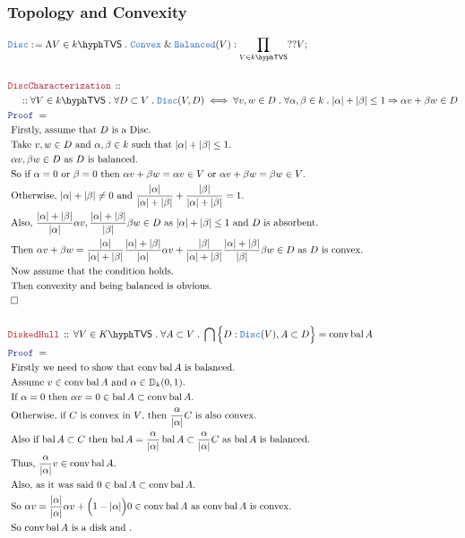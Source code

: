 \documentclass[12pt]{scrartcl}
\newcommand{\TYPE}[1]{\textcolor{NavyBlue}{\mathtt{#1}}}
\newcommand{\LOGIC}[1]{\textcolor{Blue}{\mathtt{#1}}}
\newcommand{\THM}[1]{\textcolor{Maroon}{\mathtt{#1}}}
\renewcommand{\.}{\; . \;}
\newcommand{\de}{: \kern 0.1pc =}
\newcommand{\Theorem}[2]{& \THM{#1} \, :: \, #2 \\ & \Proof = \\ }
\newcommand{\NewLine}{\\ & \kern 1pc}
\newcommand{\Page}[1]{ \begin{align*} #1 \end{align*}   }
\newcommand{\Explain}[1]{& \text{#1.} \\}
\renewcommand{\And}{\; \& \;}
\newcommand{\Imply}{\Rightarrow}
\newcommand{\Conclude}[3]{& #1 \de #2 : #3; \\}
\newcommand{\QED}{\; \square}
\newcommand{\EndProof}{& \QED \\}
\newcommand{\Proof}{\LOGIC{Proof} \; }
\newcommand{\Disc}{\mathbb{D}}
\newcommand{\Convex}{\TYPE{Convex}}
\DeclareMathOperator{\conv}{conv}
\newcommand{\TVS}[1]{{#1}\hyph\mathsf{TVS}}
\DeclareMathOperator{\bal}{\mathrm{bal}}
\begin{document}
\subsubsection{Topology and Convexity}
\Page{
	\Conclude{\TYPE{Disc}}{ \Lambda V \in \TVS{k} \. \Convex \And \TYPE{Balanced}(V) }
	{
		\prod_{V \in \TVS{k}} ??V
	}
	\\
	\Theorem{DiscCharacterization}
	{
		\NewLine ::		
		\forall V \in \TVS{k} \.
		\forall D \subset V \.
		\TYPE{Disc}(V,D)
		\iff
		\forall v,w \in D \.
		\forall \alpha, \beta \in k \.
		|\alpha| + |\beta| \le 1
		\Imply
		\alpha v + \beta w \in D 
	}
	\Explain{ Firstly, assume that $D$ is a Disc}
	\Explain{ 
		Take $v,w \in D$ and $\alpha, \beta \in k$ such that $|\alpha| + |\beta| \le 1$}
	\Explain{
		$\alpha v, \beta w \in D$ as $D$ is balanced}
	\Explain{
		So if $\alpha = 0$ or $\beta = 0$ then $\alpha v + \beta w = \alpha v \in V$ or
		$\alpha v + \beta w  = \beta w \in V$}
	\Explain{
		Otherwise, $|\alpha| + |\beta| \neq 0$ and  $ \frac{|\alpha|}{|\alpha| + |\beta|} +  
			\frac{|\beta|}{|\alpha| + |\beta|} = 1$}
	\Explain{
		Also, $\frac{|\alpha| + |\beta|}{|\alpha|} \alpha v, 
		\frac{|\alpha| + |\beta|}{|\beta|} \beta w \in D$
		as $|\alpha| + |\beta| \le 1$ and $D$ is absorbent}
	\Explain{
		Then 
		$\alpha v + \beta w = 
		\frac{|\alpha|}{|\alpha| + |\beta|} \frac{|\alpha| + |\beta|}{|\alpha|} \alpha v +  
		\frac{|\beta|}{|\alpha| + |\beta|}	\frac{|\alpha| + |\beta|}{|\beta|} \beta w \in D
		$ as $D$ is convex}
	\Explain{
		Now assume that the condition holds}
	\Explain{
		Then convexity and being balanced is obvious}
	\EndProof
	\\
	\Theorem{DiskedHull}
	{
		\forall V \in \TVS{K} \.
		\forall A \subset V \.
		\bigcap \Big\{ D : \TYPE{Disc}(V), A \subset D  \Big\} = 
		\conv \bal A
	}
	\Explain{
		Firstly we need to show that $\conv \bal A$ is balanced}
	\Explain{
		Assume $v \in \conv \bal A$ and $\alpha \in \Disc_k(0,1)$}
	\Explain{
		If $\alpha = 0$ then $\alpha v = 0 \in \bal A \subset \conv \bal A$}	
	\Explain{
		Otherwise, if $C$ is convex in $V$, 
		then $ \frac{\alpha}{|\alpha|} C$ is also convex}
	\Explain{
		Also if $\bal A \subset C$ then $ \bal A =  \frac{\alpha}{|\alpha|} \bal A \subset 
		\frac{\alpha}{|\alpha|} C$ as $\bal A$ is balanced}
	\Explain{
		Thus, $\frac{\alpha}{|\alpha|} v \in \conv \bal A $}
	\Explain{
		Also, as it was said $0 \in \bal A \subset \conv \bal A$}
	\Explain{
		So $\alpha v =  \frac{|\alpha|}{|\alpha|}  \alpha v  + \Big(1 - |\alpha|\Big)0 \in \conv \bal A$
		as $\conv \bal A$ is convex}
	\Explain{
		So $\conv \bal A$ is a disk and 
}}
\end{document}
